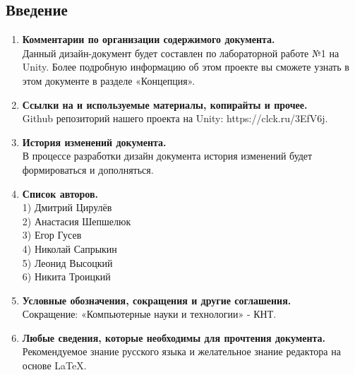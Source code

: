 \documentclass{article}
\begin{document}
\subsection*{Введение}

\begin{enumerate}
    \item \textbf{Комментарии по организации содержимого документа.} \\
    Данный дизайн-документ будет составлен по лабораторной работе №1 на Unity. Более подробную информацию об этом проекте вы сможете узнать в этом документе в разделе «Концепция».

    \item \textbf{Ссылки на и используемые материалы, копирайты и прочее.} \\
    Github репозиторий нашего проекта на Unity: https://clck.ru/3EfV6j.

    \item \textbf{История изменений документа.} \\
    В процессе разработки дизайн документа история изменений будет формироваться и дополняться.

    \item \textbf{Список авторов.} \\
    1) Дмитрий Цирулёв\\2) Анастасия Шепшелюк\\3) Егор Гусев\\4) Николай Сапрыкин\\5) Леонид Высоцкий\\6) Никита Троицкий

    \item \textbf{Условные обозначения, сокращения и другие соглашения.} \\
    Сокращение: «Компьютерные науки и технологии» - КНТ.

    \item \textbf{Любые сведения, которые необходимы для прочтения документа.} \\
    Рекомендуемое знание русского языка и желательное знание редактора на основе LaTeX.
\end{enumerate}
\end{document}
